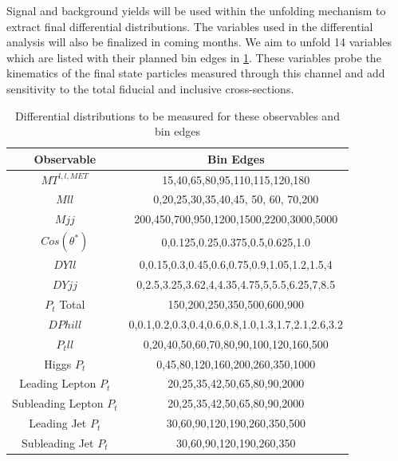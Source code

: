 Signal and background yields will be used within the unfolding mechanism to extract final differential distributions. The variables used in the differential analysis will also be finalized in coming months. We aim to unfold 14 variables which are listed with their planned bin edges in \ref{tab:observablebins}. These variables probe the kinematics of the final state particles measured through this channel and add sensitivity to the total fiducial and inclusive cross-sections.

\begin{table}[h!]
\begin{center}
\begin{tabular}{ |c||c|  }
 \hline
 Observable & Bin Edges\\
 \hline
 $MT^{l,l,MET}$ &15,40,65,80,95,110,115,120,180\\
 $Mll$&  0,20,25,30,35,40,45, 50, 60, 70,200\\
 $Mjj$ &200,450,700,950,1200,1500,2200,3000,5000\\
 $Cos(\theta^{*})$ &0,0.125,0.25,0.375,0.5,0.625,1.0\\
 $DYll$&   0,0.15,0.3,0.45,0.6,0.75,0.9,1.05,1.2,1.5,4\\
 $DYjj$& 0,2.5,3.25,3.62,4,4.35,4.75,5,5.5,6.25,7,8.5\\
 $P_{t}$ Total& 150,200,250,350,500,600,900\\
 $DPhill$& 0,0.1,0.2,0.3,0.4,0.6,0.8,1.0,1.3,1.7,2.1,2.6,3.2\\
 $P_{t} ll$&0,20,40,50,60,70,80,90,100,120,160,500\\
 Higgs $P_{t}$&0,45,80,120,160,200,260,350,1000\\
 Leading Lepton $P_{t}$&20,25,35,42,50,65,80,90,2000\\
 Subleading Lepton $P_{t}$&20,25,35,42,50,65,80,90,2000\\
 Leading Jet $P_{t}$&30,60,90,120,190,260,350,500\\
 Subleading Jet $P_{t}$& 30,60,90,120,190,260,350\\
 \hline
\end{tabular}
\end{center}
\caption{Differential distributions to be measured for these observables and bin edges}
\label{tab:observablebins}
\end{table}

